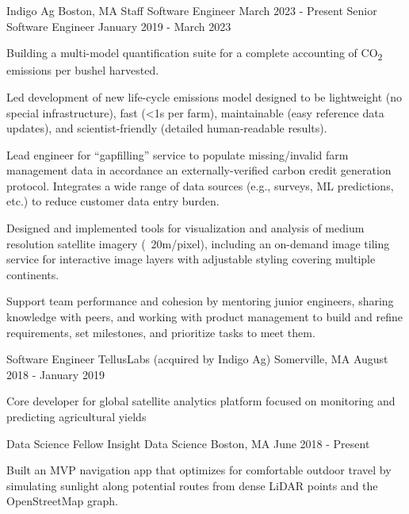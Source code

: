 \documentclass[11pt, a4paper]{awesome-cv}
\begin{document}
\begin{cventries}

  \cventrydouble
    {Indigo Ag}  %
    {Boston, MA}  %
    {Staff Software Engineer}  %
    {March 2023 - Present}  %
    {Senior Software Engineer}  %
    {January 2019 - March 2023}  %
    {
    \begin{cvitems}
      \item Building a multi-model quantification suite for a complete accounting of CO\textsubscript{2} emissions per bushel harvested.  
      \item Led development of new life-cycle emissions model designed to be lightweight (no special infrastructure), fast (<1s per farm), maintainable (easy reference data updates), and scientist-friendly (detailed human-readable results). 
      \item Lead engineer for “gapfilling” service to populate missing/invalid farm management data in accordance an externally-verified carbon credit generation protocol. Integrates a wide range of data sources (e.g., surveys, ML predictions, etc.) to reduce customer data entry burden.
      \item Designed and implemented tools for visualization and analysis of medium resolution satellite imagery (~20m/pixel), including an on-demand image tiling service for interactive image layers with adjustable styling covering multiple continents.
      \item Support team performance and cohesion by mentoring junior engineers, sharing knowledge with peers, and working with product management to build and refine requirements, set milestones, and prioritize tasks to meet them.
    \end{cvitems}
    }

  \cventrytight
    {Software Engineer}
    {TellusLabs (acquired by Indigo Ag)}
    {Somerville, MA}
    {August 2018 - January 2019}
    {
    \begin{cvitems}
      \item Core developer for global satellite analytics platform focused on monitoring and predicting agricultural yields
    \end{cvitems}
    }

  \cventrytight
    {Data Science Fellow}
    {Insight Data Science}
    {Boston, MA}
    {June 2018 - Present}
    {
    \begin{cvitems}
      \item Built an MVP navigation app that optimizes for comfortable outdoor travel by simulating sunlight along potential routes from dense LiDAR points and the OpenStreetMap graph.
    \end{cvitems}
    }


\end{cventries}
\end{document}
